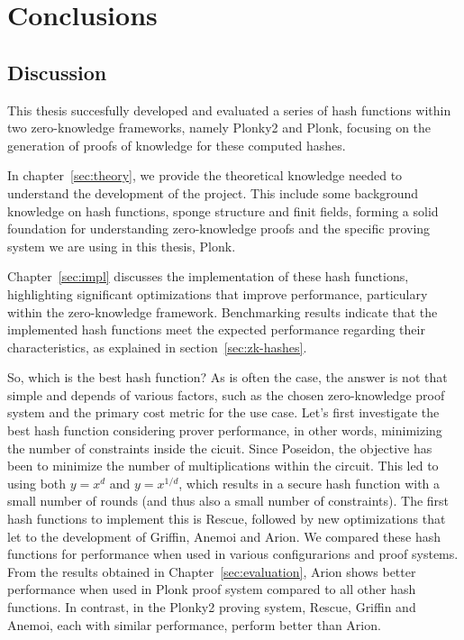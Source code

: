 \chapter{Conclusions}
\label{sec:conclusions}
\section{Discussion}
This thesis succesfully developed and evaluated a series of hash functions within two zero-knowledge frameworks, namely Plonky2 and Plonk, focusing on the generation of proofs of knowledge for these computed hashes.

In chapter~\ref{sec:theory}, we provide the theoretical knowledge needed to understand the development of the project. This include some background knowledge on hash functions, sponge structure and finit fields, forming a solid foundation for understanding zero-knowledge proofs and the specific proving system we are using in this thesis, Plonk.

Chapter~\ref{sec:impl} discusses the implementation of these hash functions, highlighting significant optimizations that improve performance, particulary within the zero-knowledge framework. Benchmarking results indicate that the implemented hash functions meet the expected performance regarding their characteristics, as explained in section~\ref{sec:zk-hashes}.

So, which is the best hash function? As is often the case, the answer is not that simple and depends of various factors, such as the chosen zero-knowledge proof system and the primary cost metric for the use case. Let's first investigate the best hash function considering prover performance, in other words, minimizing the number of constraints inside the cicuit. Since Poseidon, the objective has been to minimize the number of multiplications within the circuit. This led to using both $y=x^d$ and $y=x^{1/d}$, which results in a secure hash function with a small number of rounds (and thus also a small number of constraints). The first hash functions to implement this is Rescue, followed by new optimizations that let to the development of Griffin, Anemoi and Arion. We compared these hash functions for performance when used in various configurarions and proof systems. From the results obtained in Chapter~\ref{sec:evaluation}, Arion shows better performance when used in Plonk proof system compared to all other hash functions. In contrast, in the Plonky2 proving system, Rescue, Griffin and Anemoi, each with similar performance, perform better than Arion.

